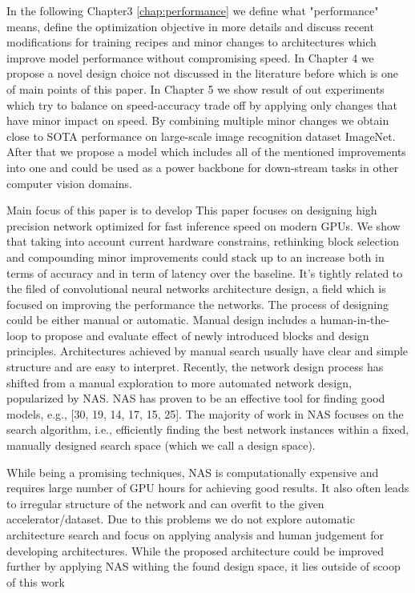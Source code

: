 In the following Chapter3 \ref{chap:performance} we define what "performance" means, define the optimization objective in more details and discuss recent modifications for training recipes and minor changes to architectures which improve model performance without compromising speed. In Chapter 4 we propose a novel design choice not discussed in the literature before which is one of main points of this paper. In Chapter 5 we show result of out experiments which try to balance on speed-accuracy trade off by applying only changes that have minor impact on speed. By combining multiple minor changes we obtain close to SOTA performance on large-scale image recognition dataset ImageNet. After that we propose a model which includes all of the mentioned improvements into one and could be used as a power backbone for down-stream tasks in other computer vision domains.

Main focus of this paper is to develop 
This paper focuses on designing high precision network optimized for fast inference speed on modern GPUs. We show that taking into account current hardware constrains, rethinking block selection and compounding minor improvements could stack up to an increase both in terms of accuracy and in term of latency over the baseline. It's tightly related to the filed of convolutional neural networks architecture design, a field which is focused on improving the performance the networks. The process of designing could be either manual or automatic. Manual design includes a human-in-the-loop to propose and evaluate effect of newly introduced blocks and design principles. Architectures achieved by manual search usually have clear and simple structure and are easy to interpret. 
Recently, the network design process has shifted from a manual exploration to more automated network design, popularized by NAS. NAS has proven to be an effective tool for finding good models, e.g., [30, 19, 14, 17, 15, 25]. The majority of work in NAS focuses on the search algorithm, i.e., efficiently finding the best network instances within a fixed, manually designed search space (which we call a design space). 

While being a promising techniques, NAS is computationally expensive and requires large number of GPU hours for achieving good results. It also often leads to irregular structure of the network and can overfit to the given accelerator/dataset. Due to this problems we do not explore automatic architecture search and focus on applying analysis and human judgement for developing architectures. While the proposed architecture could be improved further by applying NAS withing the found design space, it lies outside of scoop of this work




